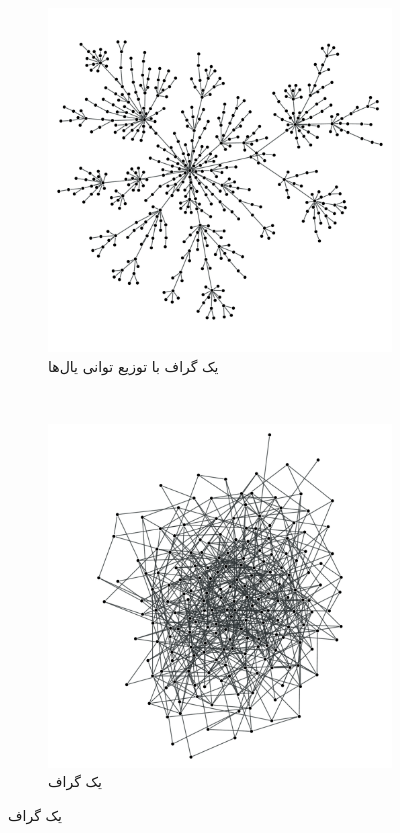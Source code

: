 \begin {persian}
 \begin{figure}[H]
 \centering
 \begin{subfigure}[b]{0.46\textwidth}
 \includegraphics[width=\textwidth]{figures/GRAPHS/power-law}
 \caption{یک گراف با توزیع توانی یال‌ها
 }
 \end{subfigure}
 ~
 \begin{subfigure}[b]{0.4\textwidth}
 \includegraphics[width=\textwidth]{figures/GRAPHS/small-world}
 \caption{یک گراف }
 

\end{subfigure}
\end{figure}
\end{persian}
